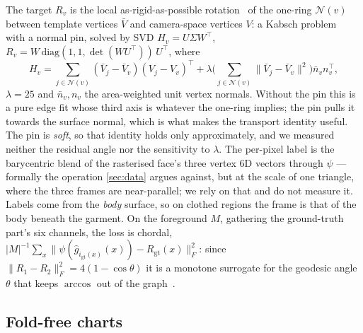 The target $R_v$ is the local as-rigid-as-possible rotation~\cite{sorkine2007arap} of the one-ring
$\mathcal{N}(v)$ between template vertices $\bar V$ and camera-space vertices $V$: a Kabsch
problem~\cite{kabsch1976} with a normal pin, solved by SVD $H_v=U\Sigma W^{\!\top}$,
$R_v=W\,\mathrm{diag}(1,1,\det(WU^{\!\top}))\,U^{\!\top}$, where
\begin{equation}
  H_v \!=\!\!\! \sum_{j \in \mathcal{N}(v)} \!\!\! (\bar V_j \!-\! \bar V_v)(V_j \!-\! V_v)^{\!\top}
      \!\!+ \lambda \Big(\!\!\!\sum_{j \in \mathcal{N}(v)}\!\!\! \lVert \bar V_j \!-\! \bar V_v \rVert^2 \Big)
        \bar n_v n_v^{\!\top}\!,
  \label{eq:kabsch}
\end{equation}
$\lambda{=}25$ and $\bar n_v,n_v$ the area-weighted unit vertex normals. Without the pin this is a
pure edge fit whose third axis is whatever the one-ring implies; the pin pulls it towards the
surface normal, which is what makes the transport identity useful. The pin is \emph{soft}, so that
identity holds only approximately, and we measured neither the residual angle nor the sensitivity
to $\lambda$. The per-pixel label is the barycentric blend of the rasterised face's three vertex
$6$D vectors through $\psi$ --- formally the operation \cref{sec:data} argues against, but at the
scale of one triangle, where the three frames are near-parallel; we rely on that and do not measure
it. Labels come from the \emph{body} surface, so on clothed regions the frame is that of the body
beneath the garment. On the foreground $M$, gathering the ground-truth part's six channels, the
loss is chordal, $|M|^{-1}\sum_x\lVert\psi(\hat
g_{i_{\mathrm{gt}}(x)}(x))-R_{\mathrm{gt}}(x)\rVert_F^2$: since $\lVert
R_1-R_2\rVert_F^2=4(1-\cos\theta)$ it is a monotone surrogate for the geodesic angle $\theta$ that
keeps $\arccos$ out of the graph~\cite{hartley2013rotation}.

\subsection{Fold-free charts}
\label{sec:charts}

